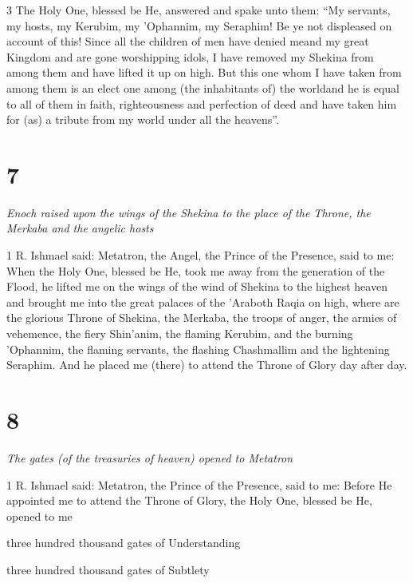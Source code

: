 \par 3 The Holy One, blessed be He, answered and spake unto them: “My servants, my hosts, my Kerubim, my 'Ophannim, my Seraphim! Be ye not displeased on account of this! Since all the children of men have denied meand my great Kingdom and are gone worshipping idols, I have removed my Shekina from among them and have lifted it up on high. But this one whom I have taken from among them is an elect one among (the inhabitants of) the worldand he is equal to all of them in faith, righteousness and perfection of deed and have taken him for (as) a tribute from my world under all the heavens”. 

\chapter{7}

\par \textit{Enoch raised upon the wings of the Shekina to the place of the Throne, the Merkaba and the angelic hosts}

\par 1 R. Ishmael said: Metatron, the Angel, the Prince of the Presence, said to me: When the Holy One, blessed be He, took me away from the generation of the Flood, he lifted me on the wings of the wind of Shekina to the highest heaven and brought me into the great palaces of the 'Araboth Raqia on high, where are the glorious Throne of Shekina, the Merkaba, the troops of anger, the armies of vehemence, the fiery Shin'anim, the flaming Kerubim, and the burning 'Ophannim, the flaming servants, the flashing Chashmallim and the lightening Seraphim. And he placed me (there) to attend the Throne of Glory day after day. 

\chapter{8}

\par \textit{The gates (of the treasuries of heaven) opened to Metatron}

\par 1 R. Ishmael said: Metatron, the Prince of the Presence, said to me: Before He appointed me to attend the Throne of Glory, the Holy One, blessed be He, opened to me 

\par three hundred thousand gates of Understanding

\par three hundred thousand gates of Subtlety

